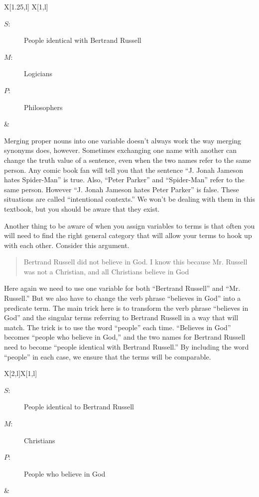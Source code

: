 \begin{tabu}{{X[1.25,l] X[1,l]}}
\begin{description}
\item[$S$:] People identical with Bertrand Russell
\item[$M$:] Logicians
\item[$P$:] Philosophers
\end{description}
&
\begin{kormanize}
\end{kormanize}
\end{tabu}

Merging proper nouns into one variable doesn't always work the way merging synonyms does, however. Sometimes exchanging one name with another can change the truth value of a sentence, even when the two names refer to the same person. Any comic book fan will tell you that the sentence ``J. Jonah Jameson hates Spider-Man'' is true. Also, ``Peter Parker'' and ``Spider-Man'' refer to the same person. However ``J. Jonah Jameson hates Peter Parker'' is false. These situations are called ``intentional contexts.'' We won't be dealing with them in this textbook, but you should be aware that they exist.

Another thing to be aware of when you assign variables to terms is that often you will need to find the right general category that will allow your terms to hook up with each other. \label{finding_general_terms} Consider this argument.

\begin{quotation}
Bertrand Russell did not believe in God. I know this because Mr. Russell was not a Christian, and all Christians believe in God
\end{quotation}

Here again we need to use one variable for both ``Bertrand Russell'' and ``Mr. Russell.'' But we also have to change the verb phrase ``believes in God'' into a predicate term. The main trick here is to transform the verb phrase ``believes in God'' and the singular terms referring to Bertrand Russell in a way that will match. The trick is to use the word ``people'' each time. ``Believes in God'' becomes ``people who believe in God,'' and the two names for Bertrand Russell need to become ``people identical with Bertrand Russell.'' By including the word ``people'' in each case, we ensure that the terms will be comparable.

\begin{tabu}{{X[2,l]X[1,l]}}
\begin{description}
\item[$S$:] People identical to Bertrand Russell
\item[$M$:] Christians
\item[$P$:] People who believe in God
\end{description}
&
\begin{kormanize}
\end{kormanize}
\end{tabu}

